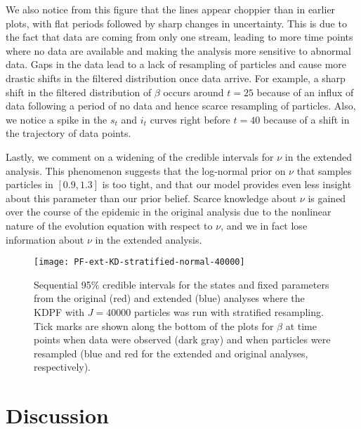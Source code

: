 \documentclass{elsarticle}
\begin{document}

We also notice from this figure that the lines appear choppier than in earlier plots, with flat periods followed by sharp changes in uncertainty. This is due to the fact that data are coming from only one stream, leading to more time points where no data are available and making the analysis more sensitive to abnormal data. Gaps in the data lead to a lack of resampling of particles and cause more drastic shifts in the filtered distribution once data arrive. For example, a sharp shift in the filtered distribution of $\beta$ occurs around $t = 25$ because of an influx of data following a period of no data and hence scarce resampling of particles. Also, we notice a spike in the $s_t$ and $i_t$ curves right before $t = 40$ because of a shift in the trajectory of data points.

Lastly, we comment on a widening of the credible intervals for $\nu$ in the extended analysis. This phenomenon suggests that the log-normal prior on $\nu$ that samples particles in $[0.9,1.3]$ is too tight, and that our model provides even less insight about this parameter than our prior belief. Scarce knowledge about $\nu$ is gained over the course of the epidemic in the original analysis due to the nonlinear nature of the evolution equation with respect to $\nu$, and we in fact lose information about $\nu$ in the extended analysis.

\begin{figure}
\centering
\texttt{[image: PF-ext-KD-stratified-normal-40000]}
\caption{Sequential 95\% credible intervals for the states and fixed parameters from the original (red) and extended (blue) analyses where the KDPF with $J = 40000$ particles was run with stratified resampling. Tick marks are shown along the bottom of the plots for $\beta$ at time points when data were observed (dark gray) and when particles were resampled (blue and red for the extended and original analyses, respectively).} \label{fig:ext}
\end{figure}

\section{Discussion \label{sec:discussion}}



\clearpage



\end{document}
